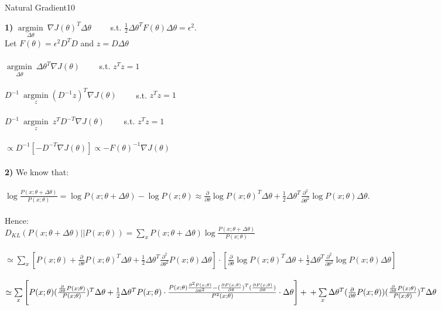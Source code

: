 \begin{questions}
\begin{question}[bonus]{Natural Gradient}{10}
\begin{answer}
\textbf{1)} $ \underset{\Delta \theta}{\operatorname{argmin}} \ \nabla J(\theta)^{T}\Delta \theta $ \ \ \ \ s.t. $ \frac{1}{2}\Delta \theta^{T}F(\theta)\Delta \theta=\epsilon^{2} $. \\
Let $ F(\theta)=\epsilon^{2} D^{T}D $ and $ z=D\Delta \theta $ \\ \\
$ \underset{\Delta \theta}{\operatorname{argmin}} \ \Delta \theta^{T} \nabla J(\theta) $ \ \ \ \ s.t. $ z^{T}z=1 $ \\ \\
$ D^{-1} \ \underset{z}{\operatorname{argmin}} (D^{-1}z)^{T}\nabla J(\theta) $ \ \ \ \ s.t. $ z^{T}z=1 $ \\ \\
$ D^{-1} \ \underset{z}{\operatorname{argmin}} \ z^{T}D^{-T}\nabla J(\theta) $ \ \ \ \ s.t. $ z^{T}z=1 $ \\ \\
$ \propto D^{-1}[-D^{-T}\nabla J(\theta)]\propto - F(\theta)^{-1}\nabla J(\theta) $ \\ \\

\textbf{2)} We know that: \\ \\
$ \log \frac{P(x;\theta + \Delta \theta)}{P(x;\theta)} = \log P(x;\theta + \Delta \theta) - \log P(x;\theta) \approx 
\frac{\partial}{\partial \theta} \log P(x;\theta)^{T} \Delta \theta + \frac{1}{2} \Delta \theta^{T} \frac{\partial^{2}}{\partial \theta^{2}} \log  P(x;\theta)\Delta \theta $. \\ \\
Hence: \\
$ D_{KL}(P(x;\theta + \Delta \theta) || P(x;\theta)) = \sum \limits_{x} P(x;\theta + \Delta \theta) \log \frac{P(x;\theta + \Delta \theta)}{P(x;\theta)} $ \\ \\
$ \simeq \sum \limits_{x} [P(x;\theta) + \frac{\partial}{\partial \theta} P(x;\theta)^{T} \Delta \theta + \frac{1}{2}\Delta \theta^{T} \frac{\partial^{2}}{\partial \theta^{2}} P(x;\theta)\Delta \theta] \cdot [\frac{\partial}{\partial \theta} \log P(x;\theta)^{T}\Delta \theta + \frac{1}{2} \Delta \theta^{T} \frac{\partial^{2}}{\partial \theta^{2}} \log P(x;\theta)\Delta \theta] $ \\ \\
$ \simeq \sum \limits_{x} \left[P(x;\theta) (\frac{\frac{\partial}{\partial \theta} P(x;\theta)}{P(x;\theta)})^{T}\Delta \theta + \frac{1}{2}\Delta \theta^{T}P(x;\theta) \cdot
\frac{P(x;\theta) \frac{\partial^{2} P(x;\theta)}{\partial \theta^{2}} - (\frac{\partial P(x;\theta)}{\partial \theta})^{T}(\frac{\partial P(x;\theta)}{\partial \theta})}{P^{2}(x;\theta)} \cdot \Delta \theta \right ] + \\ \\
+ \sum \limits_{x}\Delta \theta^{T} (\frac{\partial}{\partial \theta} P(x;\theta)) (\frac{\frac{\partial}{\partial \theta} P(x;\theta)}{P(x;\theta)})^{T} \Delta \theta $ \\ \\


\end{answer}
\end{question}
\end{questions}
